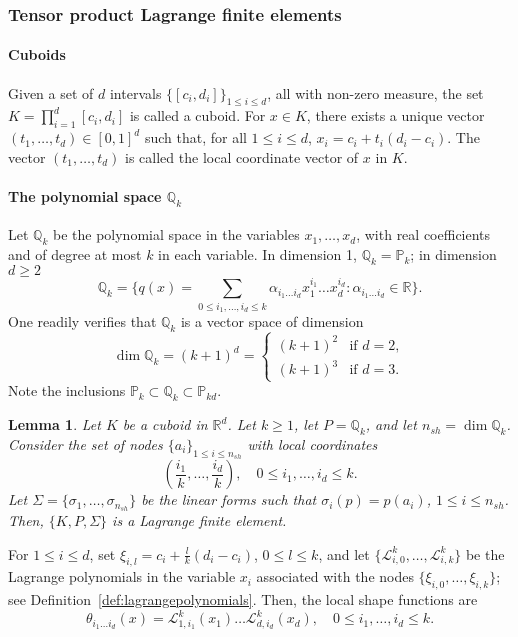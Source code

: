 \documentclass{article}
\newtheorem{lemma}{Lemma}
\begin{document}
\subsubsection{Tensor product Lagrange finite elements}
\paragraph{Cuboids}
Given a set of $d$ intervals $\{[c_i, d_i]\}_{1 \le i \le d}$, all with non-zero measure, the set $K = \prod_{i=1}^d [c_i, d_i]$ is called a cuboid. For $x \in K$, there exists a unique vector $(t_1, \dots, t_d) \in [0, 1]^d$ such that, for all $1 \le i \le d$, $x_i = c_i + t_i(d_i - c_i)$. The vector $(t_1, \dots, t_d)$ is called the local coordinate vector of $x$ in $K$.

\paragraph{The polynomial space $\mathbb{Q}_k$} Let $\mathbb{Q}_k$ be the polynomial space in the variables $x_1, \dots, x_d$, with real coefficients and of degree at most $k$ in each variable. In dimension 1, $\mathbb{Q}_k = \mathbb{P}_k$; in dimension $d \ge 2$
$$ \mathbb{Q}_k = \{ q(x) = \sum_{0 \le i_1, \dots, i_d \le k} \alpha_{i_1 \dots i_d} x_1^{i_1} \dots x_d^{i_d} : \alpha_{i_1 \dots i_d} \in \mathbb{R} \}. $$
One readily verifies that $\mathbb{Q}_k$ is a vector space of dimension
$$ \dim \mathbb{Q}_k = (k+1)^d = \begin{cases} (k+1)^2 & \text{if } d=2, \\ (k+1)^3 & \text{if } d=3. \end{cases} $$
Note the inclusions $\mathbb{P}_k \subset \mathbb{Q}_k \subset \mathbb{P}_{kd}$.

\begin{lemma}\label{lemma:tensor_product_lagrange_fe}
    Let $K$ be a cuboid in $\mathbb{R}^d$. Let $k \ge 1$, let $P = \mathbb{Q}_k$, and let $n_{sh} = \dim \mathbb{Q}_k$. Consider the set of nodes $\{a_i\}_{1 \le i \le n_{sh}}$ with local coordinates
    $$ \left(\frac{i_1}{k}, \dots, \frac{i_d}{k}\right), \quad 0 \le i_1, \dots, i_d \le k. $$
    Let $\Sigma = \{\sigma_1, \dots, \sigma_{n_{sh}}\}$ be the linear forms such that $\sigma_i(p) = p(a_i)$, $1 \le i \le n_{sh}$. Then, $\{K, P, \Sigma\}$ is a Lagrange finite element.
\end{lemma}
For $1 \le i \le d$, set $\xi_{i,l} = c_i + \frac{l}{k}(d_i - c_i)$, $0 \le l \le k$, and let $\{\mathcal{L}_{i,0}^k, \dots, \mathcal{L}_{i,k}^k\}$ be the Lagrange polynomials in the variable $x_i$ associated with the nodes $\{\xi_{i,0}, \dots, \xi_{i,k}\}$; see Definition~\ref{def:lagrangepolynomials}. Then, the local shape functions are
$$ \theta_{i_1 \dots i_d}(x) = \mathcal{L}_{1,i_1}^k(x_1) \dots \mathcal{L}_{d,i_d}^k(x_d), \quad 0 \le i_1, \dots, i_d \le k. $$
\end{document}
